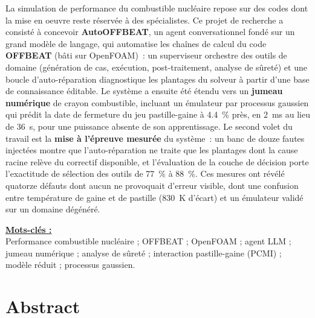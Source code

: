 \documentclass[12pt,a4paper,french]{report}
\begin{document}
\noindent
La simulation de performance du combustible nucléaire repose sur des codes dont
la mise en oeuvre reste réservée à des spécialistes. Ce projet de recherche a
consisté à concevoir \textbf{AutoOFFBEAT}, un agent conversationnel fondé sur un
grand modèle de langage, qui automatise les chaînes de calcul du code
\textbf{OFFBEAT} (bâti sur OpenFOAM)~: un superviseur orchestre des outils de
domaine (génération de cas, exécution, post-traitement, analyse de sûreté) et
une boucle d'auto-réparation diagnostique les plantages du solveur à partir
d'une base de connaissance éditable. Le système a ensuite été étendu vers un
\textbf{jumeau numérique} de crayon combustible, incluant un émulateur par
processus gaussien qui prédit la date de fermeture du jeu pastille-gaine à
\SI{4.4}{\percent} près, en \SI{2}{\milli\second} au lieu de \SI{36}{\second},
pour une puissance absente de son apprentissage. Le second volet du travail est
la \textbf{mise à l'épreuve mesurée} du système~: un banc de douze fautes
injectées montre que l'auto-réparation ne traite que les plantages dont la cause
racine relève du correctif disponible, et l'évaluation de la couche de décision
porte l'exactitude de sélection des outils de \SI{77}{\percent} à
\SI{88}{\percent}. Ces mesures ont révélé quatorze défauts dont aucun ne provoquait
d'erreur visible, dont une confusion entre température de gaine et de pastille
(\SI{830}{\kelvin} d'écart) et un émulateur validé sur un domaine dégénéré.

\vspace{0.35cm}
\noindent\textbf{\underline{Mots-clés :}}\\[2pt]
Performance combustible nucléaire ; OFFBEAT ; OpenFOAM ; agent LLM ;
jumeau numérique ; analyse de sûreté ; interaction pastille-gaine (PCMI) ;
modèle réduit ; processus gaussien.

\vspace{0.55cm}

\section*{Abstract}
\end{document}
